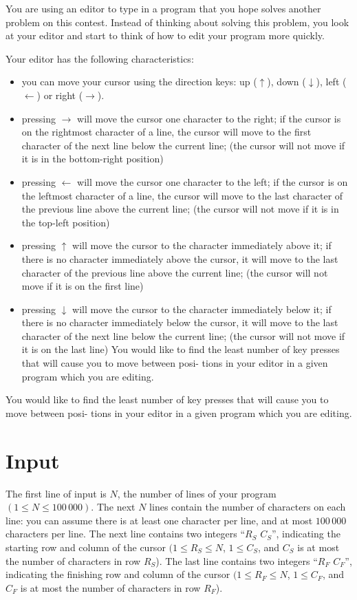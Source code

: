 You are using an editor to type in a program that you hope solves another problem on this contest.
Instead of thinking about solving this problem, you look at your editor and start to think of how to
edit your program more quickly.

Your editor has the following characteristics:
\begin{itemize}
  \item you can move your cursor using the direction keys: up ($\uparrow$), down ($\downarrow$),
  left ($\leftarrow$) or right ($\rightarrow$).

  \item pressing $\rightarrow$ will move the cursor one character to the right; if the cursor is on
  the rightmost character of a line, the cursor will move to the first character of the next line
  below the current line; (the cursor will not move if it is in the bottom-right position)

  \item pressing $\leftarrow$ will move the cursor one character to the left; if the cursor is on
  the leftmost character of a line, the cursor will move to the last character of the previous
  line above the current line; (the cursor will not move if it is in the top-left position)

  \item pressing $\uparrow$ will move the cursor to the character immediately above it; if there is
  no character immediately above the cursor, it will move to the last character of the previous
  line above the current line; (the cursor will not move if it is on the first line)

  \item pressing $\downarrow$ will move the cursor to the character immediately below it; if there
  is no character immediately below the cursor, it will move to the last character of the next
  line below the current line; (the cursor will not move if it is on the last line) You would like
  to find the least number of key presses that will cause you to move between posi- tions in your
  editor in a given program which you are editing.
\end{itemize}

You would like to find the least number of key presses that will cause you to move between posi-
tions in your editor in a given program which you are editing.

\section*{Input}
The first line of input is $N$, the number of lines of your program $(1 \leq N \leq 100\,000)$. The
next $N$ lines contain the number of characters on each line: you can assume there is at least one
character per line, and at most $100\,000$ characters per line. The next line contains two integers
``$R_S$ $C_S$'', indicating the starting row and column of the cursor $(1 \leq R_S \leq N$, $1 \leq
C_S$, and $C_S$ is at most the number of characters in row $R_S$). The last line contains two integers
``$R_F$ $C_F$'', indicating the finishing row and column of the cursor $(1 \leq R_F \leq N$, $1
\leq C_F$, and $C_F$ is at most the number of characters in row $R_F$).

